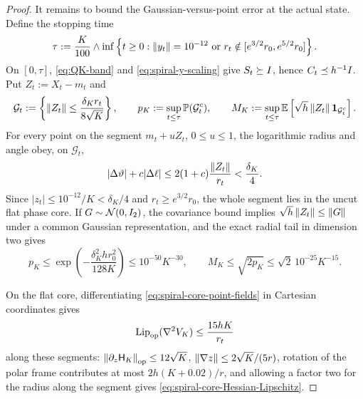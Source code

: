 \begin{proof}
    It remains to bound the Gaussian-versus-point error at the actual state. Define the
    stopping time
    \begin{equation}\label{eq:spiral-stopping-time}
        \tau:=\frac K{100}\wedge
        \inf\left\{t\geq0:\left\lVert y_t\right\rVert=10^{-12}
        \ \text{or}\ r_t\notin[e^{3/2}r_0,e^{5/2}r_0]\right\}.
    \end{equation}
    On $[0,\tau]$, \eqref{eq:QK-band} and \eqref{eq:spiral-y-scaling} give $S_t\succeq I$,
    hence $C_t\preceq h^{-1}I$. Put $Z_t:=X_t-m_t$ and
    \begin{equation*}
        \mathcal G_t:=\left\{\left\lVert Z_t\right\rVert\leq\frac{\delta_Kr_t}{8\sqrt K}\right\},
        \qquad
        p_K:=\sup_{t\leq\tau}\mathbb{P}(\mathcal G_t^c),
        \qquad
        M_K:=\sup_{t\leq\tau}\mathbb{E}\left[\sqrt h\left\lVert Z_t\right\rVert\mathbf{1}_{\mathcal G_t^c}\right].
    \end{equation*}
    For every point on the segment $m_t+uZ_t$, $0\leq u\leq1$, the logarithmic radius and angle
    obey, on $\mathcal G_t$,
    \begin{equation*}
        |\Delta\vartheta|+c|\Delta\ell|
        \leq2(1+c)\frac{\left\lVert Z_t\right\rVert}{r_t}<\frac{\delta_K}4 .
    \end{equation*}
    Since $|z_t|\leq10^{-12}/K<\delta_K/4$ and $r_t\geq e^{3/2}r_0$, the whole segment lies in
    the uncut flat phase core. If $G\sim\mathcal{N}(0,I_2)$, the covariance bound implies
    $\sqrt h\left\lVert Z_t\right\rVert\leq\left\lVert G\right\rVert$ under a common Gaussian representation, and the exact radial
    tail in dimension two gives
    \begin{equation}\label{eq:spiral-tail-certificate}
        p_K\leq\exp\left(-\frac{\delta_K^2hr_0^2}{128K}\right)\leq10^{-50}K^{-30},
        \qquad
        M_K\leq\sqrt{2p_K}\leq\sqrt2\,10^{-25}K^{-15}.
    \end{equation}

    On the flat core, differentiating \eqref{eq:spiral-core-point-fields} in Cartesian
    coordinates gives
    \begin{equation}\label{eq:spiral-core-Hessian-Lipschitz}
        \operatorname{Lip}_{\mathrm{op}}(\nabla^2V_K)\leq\frac{15hK}{r_t}
    \end{equation}
    along these segments: $\left\lVert \partial_z\mathsf H_K\right\rVert_{\mathrm{op}}\leq12\sqrt K$,
    $\left\lVert \nabla z\right\rVert\leq2\sqrt K/(5r)$, rotation of the polar frame contributes at most
    $2h(K+0.02)/r$, and allowing a factor two for the radius along the segment gives
    \eqref{eq:spiral-core-Hessian-Lipschitz}.


\end{proof}
